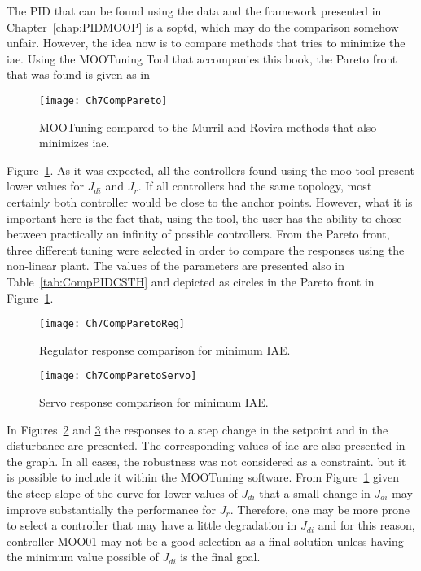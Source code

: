 The PID that can be found using the data and the framework presented in Chapter~\ref{chap:PIDMOOP} is a \gls{soptd}, which may do the comparison somehow unfair. However, the idea now is to compare methods that tries to minimize the \gls{iae}. Using the MOOTuning Tool that accompanies this book, the Pareto front that was found is given as in %
%
\begin{figure}[tb]
	\centering
	\texttt{[image: Ch7CompPareto]}
	\caption{MOOTuning compared to the Murril and Rovira methods that also minimizes \gls{iae}.}
	\label{fig:Ch7CompPareto}
\end{figure}
%
Figure~\ref{fig:Ch7CompPareto}. As it was expected, all the controllers found using the \gls{moo} tool present lower values for $J_{di}$ and $J_r$. If all controllers had the same topology, most certainly both controller would be close to the anchor points. However, what it is important here is the fact that, using the tool, the user has the ability to chose between practically an infinity of possible controllers. From the Pareto front, three different tuning were selected in order to compare the responses using the non-linear plant. The values of the parameters are presented also in Table~\ref{tab:CompPIDCSTH} and depicted as circles in the Pareto front in Figure~\ref{fig:Ch7CompPareto}.
%
\begin{figure}[tb]
	\centering
	\texttt{[image: Ch7CompParetoReg]}
	\caption{Regulator response comparison for minimum IAE.}
	\label{fig:Ch7CompParetoReg}
\end{figure}
%
\begin{figure}[tb]
	\centering
	\texttt{[image: Ch7CompParetoServo]}
	\caption{Servo response comparison for minimum IAE.}
	\label{fig:Ch7CompParetoServo}
\end{figure}

In Figures~\ref{fig:Ch7CompParetoReg} and \ref{fig:Ch7CompParetoServo} the responses to a step change in the setpoint and in the disturbance are presented. The corresponding values of \gls{iae} are also presented in the graph. In all cases, the robustness was not considered as a constraint. but it is possible to include it within the MOOTuning software. From Figure~\ref{fig:Ch7CompPareto} given the steep slope of the curve for lower values of $J_{di}$ that a small change in $J_{di}$ may improve substantially the performance for $J_r$. Therefore, one may be more prone to select a controller that may have a little degradation in $J_{di}$ and for this reason, controller MOO01 may not be a good selection as a final solution unless having the minimum value possible of $J_{di}$ is the final goal.

